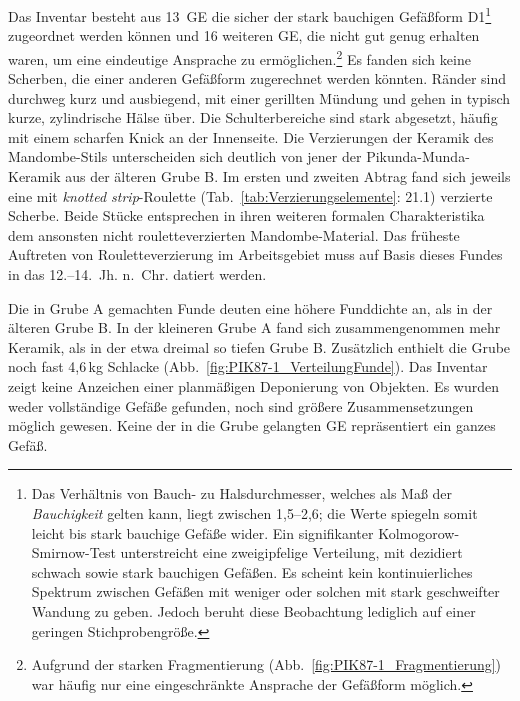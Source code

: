 Das Inventar besteht aus 13~GE die sicher der stark bauchigen Gefäßform D1\footnote{Das Verhältnis von Bauch- zu Halsdurchmesser, welches als Maß der \textit{Bauchigkeit} gelten kann, liegt zwischen 1,5--2,6; die Werte spiegeln somit leicht bis stark bauchige Gefäße wider. Ein signifikanter Kolmogorow-Smirnow-Test unterstreicht eine zweigipfelige Verteilung, mit dezidiert schwach sowie stark bauchigen Gefäßen. Es scheint kein kontinuierliches Spektrum zwischen Gefäßen mit weniger oder solchen mit stark geschweifter Wandung zu geben. Jedoch beruht diese Beobachtung lediglich auf einer geringen Stichprobengröße.} zugeordnet werden können und 16 weiteren GE, die nicht gut genug erhalten waren, um eine eindeutige Ansprache zu ermöglichen.\footnote{Aufgrund der starken Fragmentierung (Abb.~\ref{fig:PIK87-1_Fragmentierung}) war häufig nur eine eingeschränkte Ansprache der Gefäßform möglich.} Es fanden sich keine Scherben, die einer anderen Gefäßform zugerechnet werden könnten. Ränder sind durchweg kurz und ausbiegend, mit einer gerillten Mündung und gehen in typisch kurze, zylindrische Hälse über. Die Schulterbereiche sind stark abgesetzt, häufig mit einem scharfen Knick an der Innenseite. Die Verzierungen der Keramik des Mandombe-Stils unterscheiden sich deutlich von jener der Pikunda-Munda-Keramik aus der älteren Grube B. Im ersten und zweiten Abtrag fand sich jeweils eine mit \textit{knotted strip}-Roulette (Tab.~\ref{tab:Verzierungselemente}: 21.1) verzierte Scherbe. Beide Stücke entsprechen in ihren weiteren formalen Charakteristika dem ansonsten nicht rouletteverzierten Mandombe-Material. Das früheste Auftreten von Rouletteverzierung im Arbeitsgebiet muss auf Basis dieses Fundes in das 12.--14.~Jh. n.~Chr. datiert werden.

Die in Grube A gemachten Funde deuten eine höhere Funddichte an, als in der älteren Grube B. In der kleineren Grube A fand sich zusammengenommen mehr Keramik, als in der etwa dreimal so tiefen Grube B. Zusätzlich enthielt die Grube noch fast 4,6\,kg Schlacke (Abb.~\ref{fig:PIK87-1_VerteilungFunde}). Das Inventar zeigt keine Anzeichen einer planmäßigen Deponierung von Objekten. Es wurden weder vollständige Gefäße gefunden, noch sind größere Zusammensetzungen möglich gewesen. Keine der in die Grube gelangten GE repräsentiert ein ganzes Gefäß.

